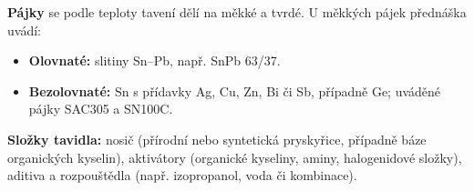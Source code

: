 \textbf{Pájky} se podle teploty tavení dělí na měkké a tvrdé. U měkkých pájek přednáška uvádí:
\begin{itemize}
\item \textbf{Olovnaté:} slitiny Sn--Pb, např. SnPb 63/37.
\item \textbf{Bezolovnaté:} Sn s přídavky Ag, Cu, Zn, Bi či Sb, případně Ge; uváděné pájky SAC305 a SN100C.
\end{itemize}
\textbf{Složky tavidla:} nosič (přírodní nebo syntetická pryskyřice, případně báze organických kyselin), aktivátory (organické kyseliny, aminy, halogenidové složky), aditiva a rozpouštědla (např. izopropanol, voda či kombinace).
